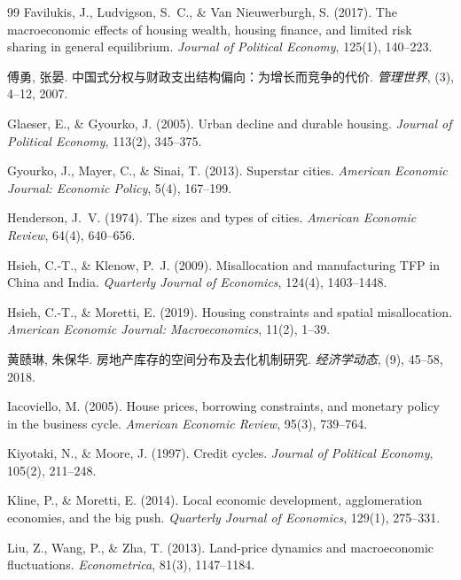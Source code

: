 \documentclass[UTF8,a4paper,12pt]{ctexart}
\theoremstyle{plain}
\theoremstyle{definition}
\theoremstyle{remark}
\begin{document}
\begin{thebibliography}{99}
Favilukis, J., Ludvigson, S.~C., \& Van Nieuwerburgh, S. (2017).
The macroeconomic effects of housing wealth, housing finance,
and limited risk sharing in general equilibrium.
\textit{Journal of Political Economy}, 125(1), 140--223.

傅勇, 张晏.
中国式分权与财政支出结构偏向：为增长而竞争的代价.
\textit{管理世界}, (3), 4--12, 2007.

Glaeser, E., \& Gyourko, J. (2005).
Urban decline and durable housing.
\textit{Journal of Political Economy}, 113(2), 345--375.

Gyourko, J., Mayer, C., \& Sinai, T. (2013).
Superstar cities.
\textit{American Economic Journal: Economic Policy}, 5(4), 167--199.

Henderson, J.~V. (1974).
The sizes and types of cities.
\textit{American Economic Review}, 64(4), 640--656.

Hsieh, C.-T., \& Klenow, P.~J. (2009).
Misallocation and manufacturing TFP in China and India.
\textit{Quarterly Journal of Economics}, 124(4), 1403--1448.

Hsieh, C.-T., \& Moretti, E. (2019).
Housing constraints and spatial misallocation.
\textit{American Economic Journal: Macroeconomics}, 11(2), 1--39.

黄赜琳, 朱保华.
房地产库存的空间分布及去化机制研究.
\textit{经济学动态}, (9), 45--58, 2018.

Iacoviello, M. (2005).
House prices, borrowing constraints, and monetary policy in the business cycle.
\textit{American Economic Review}, 95(3), 739--764.

Kiyotaki, N., \& Moore, J. (1997).
Credit cycles.
\textit{Journal of Political Economy}, 105(2), 211--248.

Kline, P., \& Moretti, E. (2014).
Local economic development, agglomeration economies, and the big push.
\textit{Quarterly Journal of Economics}, 129(1), 275--331.

Liu, Z., Wang, P., \& Zha, T. (2013).
Land-price dynamics and macroeconomic fluctuations.
\textit{Econometrica}, 81(3), 1147--1184.


\end{thebibliography}
\end{document}
